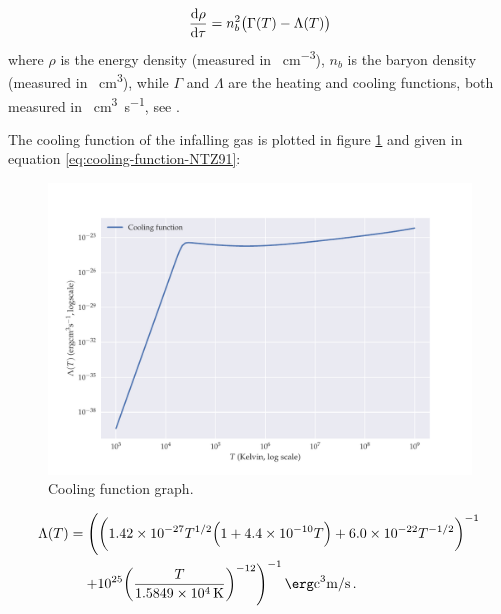 \documentclass[main.tex]{subfiles}
\begin{document}
\begin{equation}
    \dv{\rho}{\tau} = n^2_b \qty(\Gamma(T) - \Lambda (T))
\end{equation}
where \(\rho\) is the energy density (measured in \si{\erg\per\cubic\centi\metre}), \(n_b\) is the baryon density (measured in \si{\per\cubic\centi\metre}), while \(\Gamma\) and \(\Lambda\) are the heating and cooling functions, both measured in \si{\erg\cubic\centi\metre\per\second}, see \cite[equation 1]{GnedinHollon:2012}.

The cooling function of the infalling gas is plotted in figure \ref{fig:cooling-function} and given in equation \eqref{eq:cooling-function-NTZ91}:
\begin{figure}
    \centering
    \includegraphics[width=\textwidth]{figures/cooling_function.pdf}
    \caption{Cooling function graph.}
    \label{fig:cooling-function}
\end{figure}
\begin{equation} \label{eq:cooling-function-NTZ91}
    \begin{split}
    \Lambda (T) &= \left(
    \qty(
    \num{1.42e-27}T^{1/2} \qty(
    1 + \num{4.4e-10}T
    ) + \num{6.0e-22}T^{-1/2}
    )^{-1} \right. \\
    & \quad \left. + \num{e25} \qty(\frac{T}{\SI{1.5849e4}{K}})^{-12}
    \right)^{-1} \si{\erg\cubic\centi\metre\per\second} \,.
    \end{split}
\end{equation}

\end{document}
